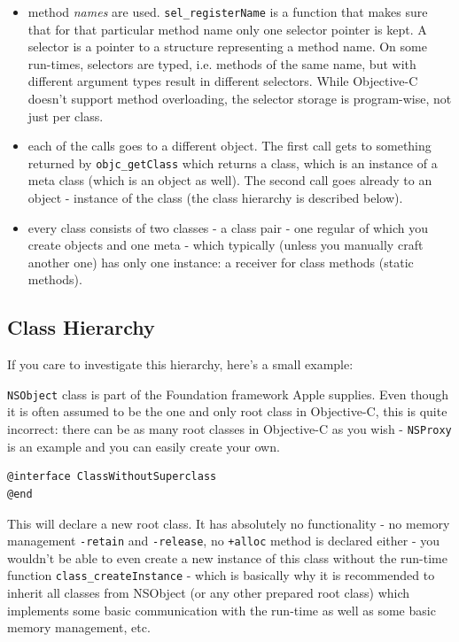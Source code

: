 \begin{itemize}
\item method \emph{names} are used. \verb=sel_registerName= is a function that makes sure that for that particular method name only one selector pointer is kept. A selector is a pointer to a structure representing a method name. On some run-times, selectors are typed, i.e. methods of the same name, but with different argument types result in different selectors. While Objective-C doesn't support method overloading, the selector storage is program-wise, not just per class.
\item each of the calls goes to a different object. The first call gets to something returned by \verb=objc_getClass= which returns a class, which is an instance of a meta class (which is an object as well). The second call goes already to an object - instance of the class (the class hierarchy is described below).
\item every class consists of two classes - a class pair - one regular of which you create objects and one meta - which typically (unless you manually craft another one) has only one instance: a receiver for class methods (static methods).
\end{itemize}

\subsection{Class Hierarchy}
If you care to investigate this hierarchy, here's a small example:

\verb=NSObject= class is part of the Foundation framework Apple supplies. Even though it is often assumed to be the one and only root class in Objective-C, this is quite incorrect: there can be as many root classes in Objective-C as you wish - \verb=NSProxy= is an example and you can easily create your own.

\begin{verbatim}@interface ClassWithoutSuperclass
@end\end{verbatim}

This will declare a new root class. It has absolutely no functionality - no memory management \verb=-retain= and \verb=-release=, no \verb=+alloc= method is declared either - you wouldn't be able to even create a new instance of this class without the run-time function \verb=class_createInstance= - which is basically why it is recommended to inherit all classes from NSObject (or any other prepared root class) which implements some basic communication with the run-time as well as some basic memory management, etc.

